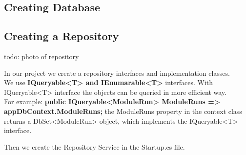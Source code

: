 \documentclass{scrartcl}
\begin{document}
\subsection{Creating Database}
\newpage
\subsection{Creating a Repository}

todo: photo of repository



In our project we create a repository interfaces and implementation classes.\\
We use \textbf{IQueryable<T> and IEnumarable<T>} interfaces.
With IQueryable<T> interface the objects can be queried in more efficient way.\\
For example: \textbf{public IQueryable<ModuleRun> ModuleRuns => appDbContext.ModuleRuns;} the ModuleRuns property in the context class returns a DbSet<ModuleRun> object, which implements the IQueryable<T> interface.

\noindent                                                                %
\begin{minipage}{\linewidth}                     
\end{minipage}


\newpage

Then we create the Repository Service in the Startup.cs file.\\
\end{document}
